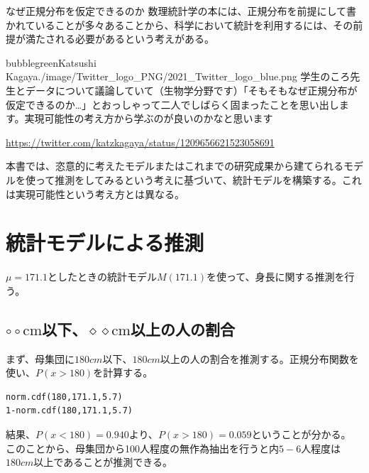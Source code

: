 \begin{SMbox}{なぜ正規分布を仮定できるのか}
 数理統計学の本には、正規分布を前提にして書かれていることが多々あることから、科学において統計を利用するには、その前提が満たされる必要があるという考えがある。%

  \begin{rightbubbles}{bubblegreen}{Katsushi Kagaya}{./image/Twitter_logo_PNG/2021_Twitter_logo_blue.png} 学生のころ先生とデータについて議論していて（生物学分野です）「そもそもなぜ正規分布が仮定できるのか…」とおっしゃって二人でしばらく固まったことを思い出します。実現可能性の考え方から学ぶのが良いのかなと思います
   \begin{flushright}
    \small	\url{https://twitter.com/katzkagaya/status/1209656621523058691}
   \end{flushright}
  \end{rightbubbles}
 本書では、恣意的に考えたモデルまたはこれまでの研究成果から建てられるモデルを使って推測をしてみるという考えに基づいて、統計モデルを構築する。これは実現可能性という考え方とは異なる。
\end{SMbox}



\section{統計モデルによる推測}
$\mu=171.1$としたときの統計モデル$M(171.1)$を使って、身長に関する推測を行う。

\subsection{ $\circ\circ \mathrm{cm}$以下、$\diamond\diamond \mathrm{cm}$以上の人の割合}
まず、母集団に$180cm$以下、$180cm$以上の人の割合を推測する。正規分布関数を使い、$P(x>180)$を計算する。

\begin{lstlisting}
norm.cdf(180,171.1,5.7)
1-norm.cdf(180,171.1,5.7)
\end{lstlisting}
結果、$P(x<180)=0.940$より、$P(x>180)=0.059$ということが分かる。
このことから、母集団から100人程度の無作為抽出を行うと内$5-6$人程度は$180cm$以上であることが推測できる。

